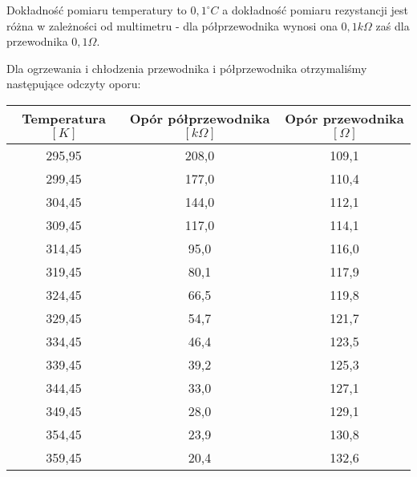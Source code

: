 \documentclass[10pt,a4paper]{article}
\newcommand{\forceindent}{\leavevmode{\parindent=3em\indent}}
\begin{document}
\forceindent Dokładność pomiaru temperatury to $0,1 ^{\circ}C$ a dokładność pomiaru rezystancji jest różna w zależności od multimetru - dla półprzewodnika wynosi ona $0,1 k\Omega$ zaś dla przewodnika $0,1 \Omega$.


\forceindent Dla ogrzewania i chłodzenia przewodnika i półprzewodnika otrzymaliśmy następujące odczyty oporu:\\
\vspace{10pt}
\begin{center}
\begin{tabular}{|c|c|c|}
\multicolumn{1}{c}{Temperatura $[K]$} & \multicolumn{1}{c}{Opór półprzewodnika $[k\Omega]$} & \multicolumn{1}{c}{Opór przewodnika $[\Omega]$}\\
\hline
295,95&208,0&109,1\\ 
 \hline 
299,45&177,0&110,4\\ 
 \hline 
304,45&144,0&112,1\\ 
 \hline 
309,45&117,0&114,1\\ 
 \hline 
314,45&95,0&116,0\\ 
 \hline 
319,45&80,1&117,9\\ 
 \hline 
324,45&66,5&119,8\\ 
 \hline 
329,45&54,7&121,7\\ 
 \hline 
334,45&46,4&123,5\\ 
 \hline 
339,45&39,2&125,3\\ 
 \hline 
344,45&33,0&127,1\\ 
 \hline 
349,45&28,0&129,1\\ 
 \hline 
354,45&23,9&130,8\\ 
 \hline 
359,45&20,4&132,6\\ 
 \hline 
\end{tabular}
\end{center}
\end{document}
